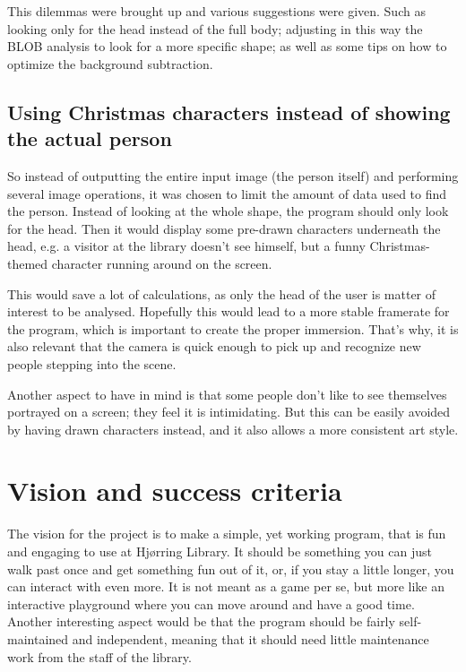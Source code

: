 This dilemmas were brought up and various suggestions were given. Such as looking only for the head instead of the full body; adjusting in this way the BLOB analysis to look for a more specific shape; as well as some tips on how to optimize the background subtraction.


\subsection{Using Christmas characters instead of showing the actual person}
So instead of outputting the entire input image (the person itself) and performing several image operations, it was chosen to limit the amount of data used to find the person. Instead of looking at the whole shape, the program should only look for the head. Then it would display some pre-drawn characters underneath the head, e.g. a visitor at the library doesn't see himself, but a funny Christmas-themed character running around on the screen.

This would save a lot of calculations, as only the head of the user is matter of interest to be analysed. Hopefully this would lead to a more stable framerate for the program, which is important to create the proper immersion. That's why, it is also relevant that the camera is quick enough to pick up and recognize new people stepping into the scene.

Another aspect to have in mind is that some people don't like to see themselves portrayed on a screen; they feel it is intimidating. But this can be easily avoided by having drawn characters instead, and it also allows a more consistent art style.
  
\section{Vision and success criteria}
The vision for the project is to make a simple, yet working program, that is fun and engaging to use at Hj{\o}rring Library. It should be something you can just walk past once and get something fun out of it, or, if you stay a little longer, you can interact with even more. It is not meant as a game per se, but more like an interactive playground where you can move around and have a good time. Another interesting aspect would be that the program should be fairly self-maintained and independent, meaning that it should need little maintenance work from the staff of the library.

